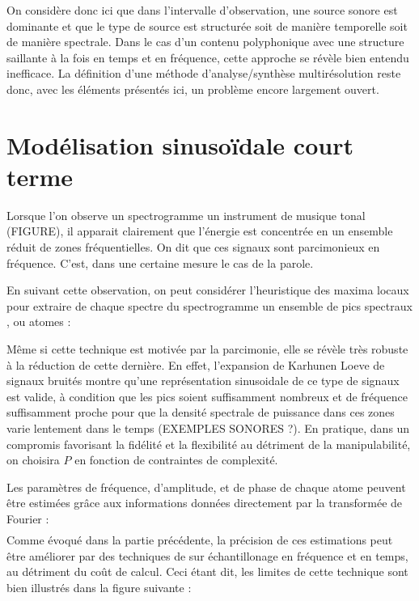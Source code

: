 On considère donc ici que dans l'intervalle d'observation, une source sonore est dominante et que le type de source est structurée soit de manière temporelle soit de manière spectrale. Dans le cas d'un contenu polyphonique avec une structure saillante à la fois en temps et en fréquence, cette approche se révèle bien entendu inefficace. La définition d'une méthode d'analyse/synthèse multirésolution reste donc, avec les éléments présentés ici, un problème encore largement ouvert.

\section{Modélisation sinusoïdale court terme}  \label{sec:sct}

Lorsque l'on observe un spectrogramme un instrument de musique tonal (FIGURE), il apparait clairement que l'énergie est concentrée en un ensemble réduit de zones fréquentielles. On dit que ces signaux sont parcimonieux en fréquence. C'est, dans une certaine mesure le cas de la parole.

En suivant cette observation, on peut considérer l'heuristique des maxima locaux pour extraire de chaque spectre du spectrogramme un ensemble de \og pics spectraux \fg, ou \og atomes \fg :

Même si cette technique est motivée par la parcimonie, elle se révèle très robuste à la réduction de cette dernière. En effet, l'expansion de Karhunen Loeve de signaux bruités montre qu'une représentation sinusoidale de ce type de signaux est valide, à condition que les pics soient suffisamment nombreux et de fréquence suffisamment proche pour que la densité spectrale de puissance dans ces zones varie lentement dans le temps \cite{mcaulay} (EXEMPLES SONORES ?). En pratique, dans un compromis favorisant la fidélité et la flexibilité au détriment de la manipulabilité, on choisira $P$ en fonction de contraintes de complexité.

Les paramètres de fréquence, d'amplitude, et de phase de chaque atome peuvent être estimées grâce aux informations données directement par la transformée de Fourier :
\begin{eqnarray}
\end{eqnarray}
Comme évoqué dans la partie précédente, la précision de ces estimations peut être améliorer par des techniques de sur échantillonage en fréquence et en temps, au détriment du coût de calcul. Ceci étant dit, les limites de cette technique sont bien illustrés dans la figure suivante :

